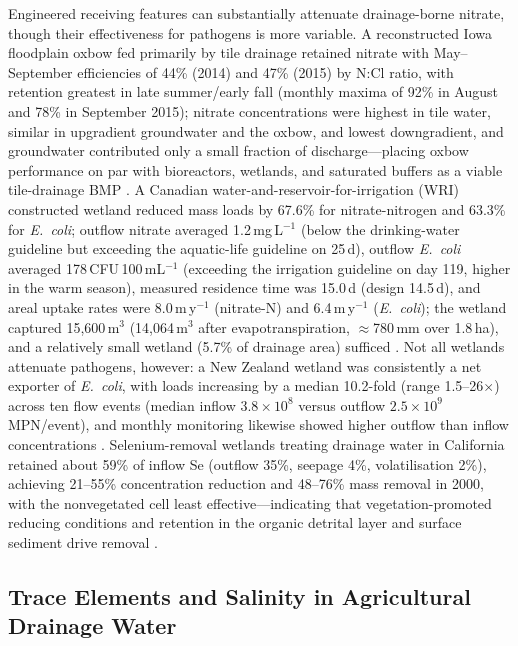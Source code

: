 \documentclass[11pt]{article}
\begin{document}
Engineered receiving features can substantially attenuate drainage-borne nitrate, though their effectiveness for pathogens is more variable. A reconstructed Iowa floodplain oxbow fed primarily by tile drainage retained nitrate with May--September efficiencies of 44\% (2014) and 47\% (2015) by N:Cl ratio, with retention greatest in late summer/early fall (monthly maxima of 92\% in August and 78\% in September 2015); nitrate concentrations were highest in tile water, similar in upgradient groundwater and the oxbow, and lowest downgradient, and groundwater contributed only a small fraction of discharge---placing oxbow performance on par with bioreactors, wetlands, and saturated buffers as a viable tile-drainage BMP \parencite{Schilling2017}. A Canadian water-and-reservoir-for-irrigation (WRI) constructed wetland reduced mass loads by 67.6\% for nitrate-nitrogen and 63.3\% for \textit{E.\ coli}; outflow nitrate averaged 1.2\,mg\,L$^{-1}$ (below the drinking-water guideline but exceeding the aquatic-life guideline on 25\,d), outflow \textit{E.\ coli} averaged 178\,CFU\,100\,mL$^{-1}$ (exceeding the irrigation guideline on day 119, higher in the warm season), measured residence time was 15.0\,d (design 14.5\,d), and areal uptake rates were 8.0\,m\,y$^{-1}$ (nitrate-N) and 6.4\,m\,y$^{-1}$ (\textit{E.\ coli}); the wetland captured 15{,}600\,m$^{3}$ (14{,}064\,m$^{3}$ after evapotranspiration, $\approx$780\,mm over 1.8\,ha), and a relatively small wetland (5.7\% of drainage area) sufficed \parencite{Haverstock2017}. Not all wetlands attenuate pathogens, however: a New Zealand wetland was consistently a net exporter of \textit{E.\ coli}, with loads increasing by a median 10.2-fold (range 1.5--26$\times$) across ten flow events (median inflow $3.8\times10^{8}$ versus outflow $2.5\times10^{9}$\,MPN/event), and monthly monitoring likewise showed higher outflow than inflow concentrations \parencite{Stott2023}. Selenium-removal wetlands treating drainage water in California retained about 59\% of inflow Se (outflow 35\%, seepage 4\%, volatilisation 2\%), achieving 21--55\% concentration reduction and 48--76\% mass removal in 2000, with the nonvegetated cell least effective---indicating that vegetation-promoted reducing conditions and retention in the organic detrital layer and surface sediment drive removal \parencite{Gao2003}.

\subsection{Trace Elements and Salinity in Agricultural Drainage Water}
\end{document}
